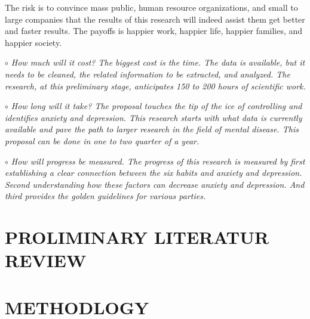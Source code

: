 \documentclass[letterpaper, 10 pt, conference]{ieeeconf}  %
\begin{document}
\textnormal{
The risk is to convince mass public, human resource organizations, and small 
to large companies that the results of this research will indeed assist them 
get better and faster results. The payoffs is happier work, happier life, 
happier families, and happier society.  
}
\par\noindent\it{$\circ$ How much will it cost?}\newline
\textnormal{
The biggest cost is the time. The data is available, but it 
needs to be cleaned, the related information to be extracted, and analyzed. 
The research, at this preliminary stage, anticipates 150 to 200 hours of scientific work. 
}
\par\noindent\it{$\circ$ How long will it take?}\newline
\textnormal{
The proposal touches the tip of the ice of controlling and identifies anxiety 
and depression. This research starts with what data is currently available 
and pave the path to larger research in the field of mental disease. This 
proposal can be done in one to two quarter of a year.
}
\par\noindent\it{$\circ$ How will progress be measured.}\newline
\textnormal{
The progress of this research is measured by first establishing a clear connection 
between the six habits and anxiety and depression. Second understanding how these 
factors can decrease anxiety and depression. And third provides the golden 
guidelines for various parties.
}
\section{PROLIMINARY LITERATUR REVIEW}

\section{METHODLOGY}



\end{document}
